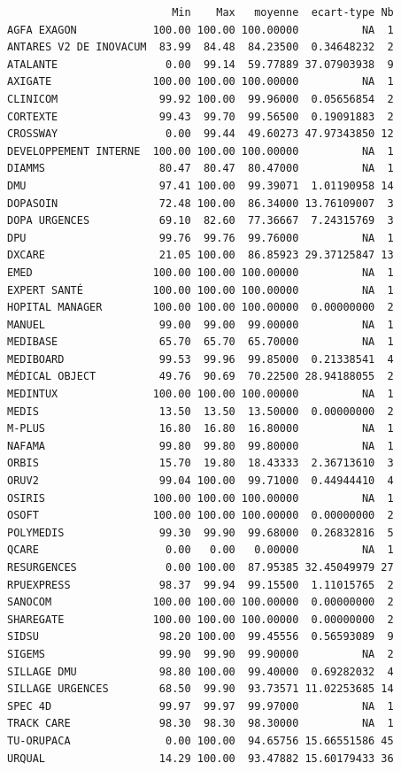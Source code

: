 \documentclass[]{article}
\begin{document}
\begin{verbatim}
                          Min    Max   moyenne  ecart-type Nb
AGFA EXAGON            100.00 100.00 100.00000          NA  1
ANTARES V2 DE INOVACUM  83.99  84.48  84.23500  0.34648232  2
ATALANTE                 0.00  99.14  59.77889 37.07903938  9
AXIGATE                100.00 100.00 100.00000          NA  1
CLINICOM                99.92 100.00  99.96000  0.05656854  2
CORTEXTE                99.43  99.70  99.56500  0.19091883  2
CROSSWAY                 0.00  99.44  49.60273 47.97343850 12
DEVELOPPEMENT INTERNE  100.00 100.00 100.00000          NA  1
DIAMMS                  80.47  80.47  80.47000          NA  1
DMU                     97.41 100.00  99.39071  1.01190958 14
DOPASOIN                72.48 100.00  86.34000 13.76109007  3
DOPA URGENCES           69.10  82.60  77.36667  7.24315769  3
DPU                     99.76  99.76  99.76000          NA  1
DXCARE                  21.05 100.00  86.85923 29.37125847 13
EMED                   100.00 100.00 100.00000          NA  1
EXPERT SANTÉ           100.00 100.00 100.00000          NA  1
HOPITAL MANAGER        100.00 100.00 100.00000  0.00000000  2
MANUEL                  99.00  99.00  99.00000          NA  1
MEDIBASE                65.70  65.70  65.70000          NA  1
MEDIBOARD               99.53  99.96  99.85000  0.21338541  4
MÉDICAL OBJECT          49.76  90.69  70.22500 28.94188055  2
MEDINTUX               100.00 100.00 100.00000          NA  1
MEDIS                   13.50  13.50  13.50000  0.00000000  2
M-PLUS                  16.80  16.80  16.80000          NA  1
NAFAMA                  99.80  99.80  99.80000          NA  1
ORBIS                   15.70  19.80  18.43333  2.36713610  3
ORUV2                   99.04 100.00  99.71000  0.44944410  4
OSIRIS                 100.00 100.00 100.00000          NA  1
OSOFT                  100.00 100.00 100.00000  0.00000000  2
POLYMEDIS               99.30  99.90  99.68000  0.26832816  5
QCARE                    0.00   0.00   0.00000          NA  1
RESURGENCES              0.00 100.00  87.95385 32.45049979 27
RPUEXPRESS              98.37  99.94  99.15500  1.11015765  2
SANOCOM                100.00 100.00 100.00000  0.00000000  2
SHAREGATE              100.00 100.00 100.00000  0.00000000  2
SIDSU                   98.20 100.00  99.45556  0.56593089  9
SIGEMS                  99.90  99.90  99.90000          NA  2
SILLAGE DMU             98.80 100.00  99.40000  0.69282032  4
SILLAGE URGENCES        68.50  99.90  93.73571 11.02253685 14
SPEC 4D                 99.97  99.97  99.97000          NA  1
TRACK CARE              98.30  98.30  98.30000          NA  1
TU-ORUPACA               0.00 100.00  94.65756 15.66551586 45
URQUAL                  14.29 100.00  93.47882 15.60179433 36
\end{verbatim}
\end{document}
